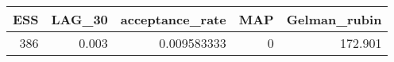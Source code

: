 \begin{longtable}{rrrrr}
\toprule
ESS & LAG\_30 & acceptance\_rate & MAP & Gelman\_rubin \\ 
\midrule
386 & 0.003 & 0.009583333 & 0 & 172.901 \\ 
\bottomrule
\end{longtable}

